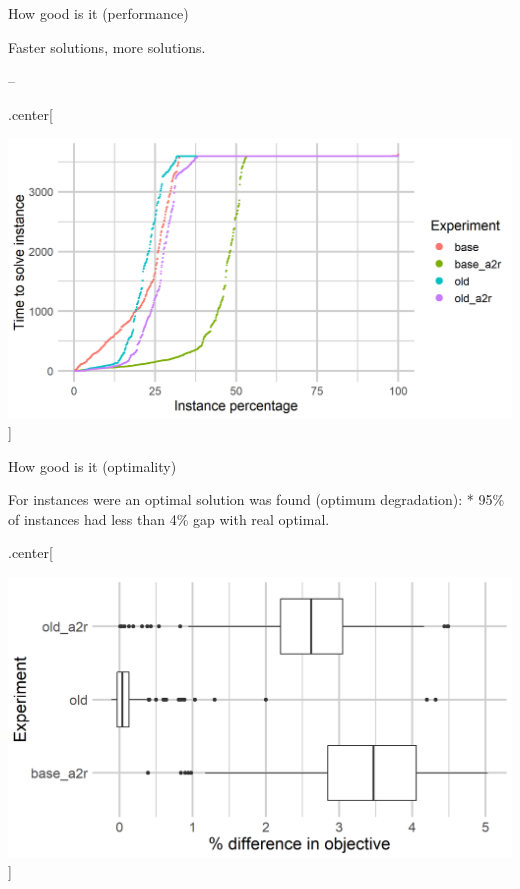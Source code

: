 \documentclass[usenames,dvipsnames]{beamer}
\begin{document}
\begin{frame}

\begin{block}{How good is it (performance)}

Faster solutions, more solutions.

--

.center{[}

\includegraphics[width=0.8\linewidth]{time_performance_ordered_2tasks}
{]}

\end{block}

\end{frame}

\begin{frame}

\begin{block}{How good is it (optimality)}

For instances were an optimal solution was found (optimum degradation):
* 95\% of instances had less than 4\% gap with real optimal.

.center{[}

\includegraphics[width=0.8\linewidth]{quality_degradation_2tasks} {]}

\end{block}

\end{frame}
\end{document}
